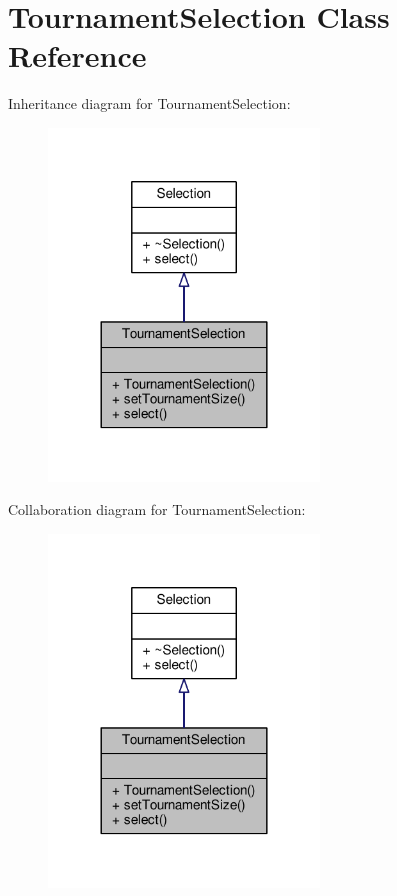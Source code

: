 \hypertarget{classTournamentSelection}{}\section{Tournament\+Selection Class Reference}
\label{classTournamentSelection}


Inheritance diagram for Tournament\+Selection\+:
\nopagebreak
\begin{figure}[H]
\begin{center}
\leavevmode
\includegraphics[width=204pt]{classTournamentSelection__inherit__graph}
\end{center}
\end{figure}


Collaboration diagram for Tournament\+Selection\+:
\nopagebreak
\begin{figure}[H]
\begin{center}
\leavevmode
\includegraphics[width=204pt]{classTournamentSelection__coll__graph}
\end{center}
\end{figure}
